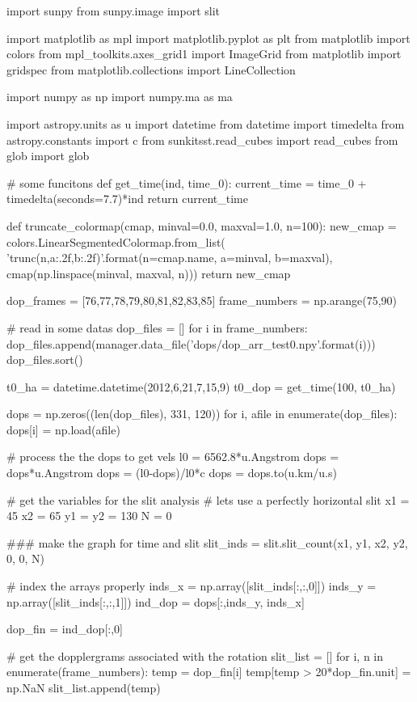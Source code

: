 \documentclass{emulateapj}
\begin{document}
\begin{pycode}[DOPPLER]
import sunpy
from sunpy.image import slit

import matplotlib as mpl
import matplotlib.pyplot as plt
from matplotlib import colors
from mpl_toolkits.axes_grid1 import ImageGrid
from matplotlib import gridspec
from matplotlib.collections import LineCollection

import numpy as np
import numpy.ma as ma

import astropy.units as u
import datetime
from datetime import timedelta
from astropy.constants import c
from sunkitsst.read_cubes import read_cubes
from glob import glob

# some funcitons
def get_time(ind, time_0):
    current_time = time_0 + timedelta(seconds=7.7)*ind
    return current_time

def truncate_colormap(cmap, minval=0.0, maxval=1.0, n=100):
    new_cmap = colors.LinearSegmentedColormap.from_list(
        'trunc({n},{a:.2f},{b:.2f})'.format(n=cmap.name, a=minval, b=maxval),
        cmap(np.linspace(minval, maxval, n)))
    return new_cmap


dop_frames = [76,77,78,79,80,81,82,83,85]
frame_numbers = np.arange(75,90)

# read in some datas
dop_files = []
for i in frame_numbers:
	dop_files.append(manager.data_file('dops/dop_arr_test0{}.npy'.format(i)))
dop_files.sort()

t0_ha = datetime.datetime(2012,6,21,7,15,9)
t0_dop = get_time(100, t0_ha)

dops = np.zeros((len(dop_files), 331, 120))
for i, afile in enumerate(dop_files):
    dops[i] = np.load(afile)

# process the the dops to get vels
l0 = 6562.8*u.Angstrom
dops = dops*u.Angstrom
dops = (l0-dops)/l0*c
dops = dops.to(u.km/u.s)

# get the variables for the slit analysis
# lets use a perfectly horizontal slit
x1 = 45
x2 = 65
y1 = y2 = 130
N = 0


### make the graph for time and slit
slit_inds = slit.slit_count(x1, y1, x2, y2, 0, 0, N)

# index the arrays properly
inds_x = np.array([slit_inds[:,:,0]])
inds_y = np.array([slit_inds[:,:,1]])
ind_dop = dops[:,inds_y, inds_x]

dop_fin = ind_dop[:,0]

# get the dopplergrams associated with the rotation
slit_list = []
for i, n in enumerate(frame_numbers):
    temp = dop_fin[i]
    temp[temp > 20*dop_fin.unit] = np.NaN
    slit_list.append(temp)


\end{pycode}
\end{document}
